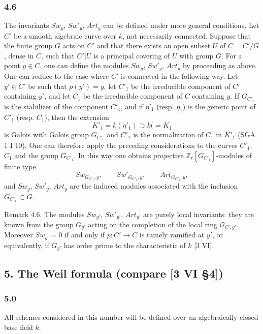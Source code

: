 \documentclass[11pt]{article}
\begin{document}
\subsubsection*{4.6}

The invariants $Sw_y$, $Sw'_y$, $Art_y$ can be defined under more general conditions. Let $C'$ be a smooth algebraic curve over $k$, not necessarily connected. Suppose that the finite group $G$ acts on $C'$ and that there exists an open subset $U$ of $C=C'/G$, dense in $C$, such that $C'|U$ is a principal covering of $U$ with group $G$. For a point $y\in C$, one can define the modules $Sw_y$, $Sw'_y$, $Art_y$ by proceeding as above. One can reduce to the case where $C'$ is connected in the following way. Let $y'\in C'$ be such that $p(y')=y$, let $C'_1$ be the irreducible component of $C'$ containing $y'$, and let $C_1$ be the irreducible component of $C$ containing $y$. If $G_{C'_1}$ is the stabilizer of the component $C'_1$, and if $\eta'_1$ (resp. $\eta_1$) is the generic point of $C'_1$ (resp. $C_1$), then the extension
\[
K'_1=k(\eta'_1)\supset k(=K_1
\]
is Galois with Galois group $G_{C'_1}$ and $C'_1$ is the normalization of $C_1$ in $K'_1$ (SGA 1 I 10). One can therefore apply the preceding considerations to the curves $C'_1$, $C_1$ and the group $G_{C'_1}$. In this way one obtains projective $\mathbb Z_\ell[G_{C'_1}]$-modules of finite type
\[
Sw_{G_{C'_1},y},\qquad Sw'_{G_{C'_1},y},\qquad Art_{G_{C'_1},y},
\]
and $Sw_y$, $Sw'_y$, $Art_y$ are the induced modules associated with the inclusion $G_{C'_1}\subset G$.

Remark 4.6. The modules $Sw_{y'}$, $Sw'_{y'}$, $Art_{y'}$ are purely local invariants: they are known from the group $G_{y'}$ acting on the completion of the local ring $\mathcal O_{C',y'}$. Moreover $Sw_{y'}=0$ if and only if $p:C'\to C$ is tamely ramified at $y'$, or equivalently, if $G_{y'}$ has order prime to the characteristic of $k$ [3 VI].

\subsection*{5. The Weil formula (compare [3 VI §4])}

\subsubsection*{5.0}

All schemes considered in this number will be defined over an algebraically closed base field $k$.
\end{document}
